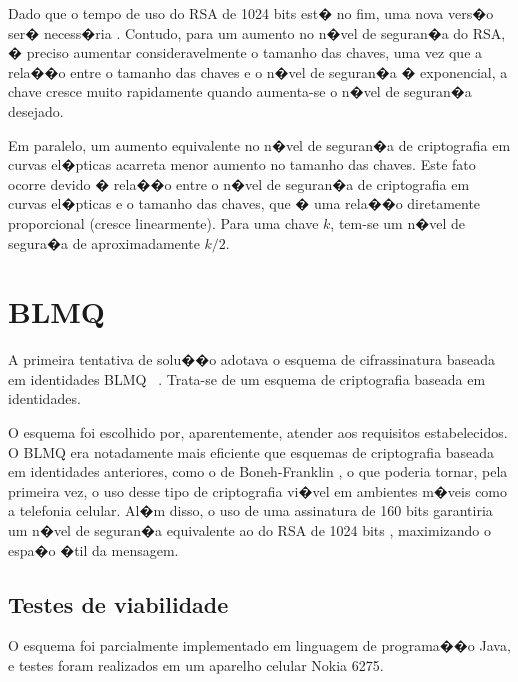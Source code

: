 \documentclass[a4paper,capchap,espacoduplo,normaltoc]{abntepusp}
\begin{document}
Dado que o tempo de uso do RSA de 1024 bits est� no fim, uma nova vers�o ser� necess�ria \cite{rsalabs}. Contudo, para um aumento no n�vel de seguran�a do RSA, � preciso aumentar consideravelmente o tamanho das chaves, uma vez que a rela��o entre o tamanho das chaves e o n�vel de seguran�a � exponencial, a chave cresce muito rapidamente quando aumenta-se o n�vel de seguran�a desejado.\cite{menezes} %

Em paralelo, um aumento equivalente no n�vel de seguran�a de criptografia em curvas el�pticas acarreta menor aumento no tamanho das chaves. Este fato ocorre devido � rela��o entre o n�vel de seguran�a de criptografia em curvas el�pticas e o tamanho das chaves, que � uma rela��o diretamente proporcional (cresce linearmente). Para uma chave $k$, tem-se um n�vel de segura�a de aproximadamente $k/2$. \cite{menezes}%

\section{BLMQ}

A primeira tentativa de solu��o adotava o esquema de cifrassinatura baseada em identidades BLMQ ~\cite{barreto-libert-mccullagh-quisquater}. Trata-se de um esquema de criptografia baseada em identidades.

O esquema foi escolhido por, aparentemente, atender aos requisitos estabelecidos. O BLMQ era notadamente mais eficiente que esquemas de criptografia baseada em identidades anteriores, como o de Boneh-Franklin \cite{boneh-franklin}, o que poderia tornar, pela primeira vez, o uso desse tipo de criptografia vi�vel em ambientes m�veis como a telefonia celular. Al�m disso, o uso de uma assinatura de 160 bits garantiria um n�vel de seguran�a equivalente ao do RSA de 1024 bits \cite{rsalabs}, maximizando o espa�o �til da mensagem.

\subsection{Testes de viabilidade}

O esquema foi parcialmente implementado em linguagem de programa��o Java, e testes foram realizados em um aparelho celular Nokia 6275.
\end{document}
